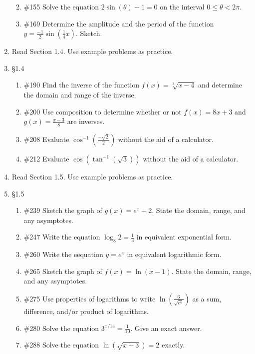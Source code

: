 \documentclass[11pt]{report}
\theoremstyle{plain}
\begin{document}
\begin{enumerate}
\begin{enumerate}
	\item \#155 Solve the equation $2 \sin (\theta) -1=0$ on the interval $0 \leq \theta < 2 \pi$.
	\item \#169 Determine the amplitude and the period of the function $y=\frac{-1}{2}\sin(\frac{1}{4}x).$ Sketch.\\
	\end{enumerate}
\item Read Section 1.4. Use example problems as practice.
\item{\S 1.4} 
	\begin{enumerate}
	\item \#190 Find the inverse of the function $f(x)=\sqrt[3]{x-4}$ and determine the domain and range of the inverse. 
	\item \#200 Use composition to determine whether or not $f(x)=8x+3$ and $g(x)=\frac{x-3}{8}$ are inverses.
	\item \#208 Evaluate $\cos^{-1}(\frac{-\sqrt{2}}{2})$ without the aid of a calculator.
	\item \#212 Evaluate $\cos(\tan^{-1}(\sqrt{3}))$ without the aid of a calculator.\\
	\end{enumerate}
\item Read Section 1.5. Use example problems as practice.
\item{\S 1.5} 
	\begin{enumerate}
	\item \#239 Sketch the graph of $g(x)=e^x+2.$ State the domain, range, and any asymptotes.
	\item \#247 Write the equation $\log_8 2 =\frac{1}{3}$ in equivalent exponential form.
	\item \#260 Write the eequation $y=e^x$ in equivalent logarithmic form.
	\item \#265 Sketch the graph of $f(x)=\ln(x-1)$. State the domain, range, and any asymptotes. 
	\item \#275 Use properties of logarithms to write $\ln \left( \frac{6}{\sqrt{e^6}}\right)$ as a sum, difference, and/or product of logarithms.
	\item \#280 Solve the equation $3^{x/14}=\frac{1}{10}$. Give an exact answer. 
	\item \#288 Solve the equation $\ln ( \sqrt{x+3})=2$ exactly.\\
	\end{enumerate}

\end{enumerate}
\end{document}
